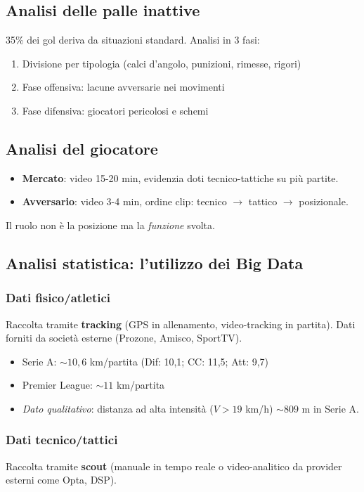 \documentclass[a4paper,11pt]{article}
\begin{document}
\subsection{Analisi delle palle inattive}
35\% dei gol deriva da situazioni standard. Analisi in 3 fasi:
\begin{enumerate}
    \item Divisione per tipologia (calci d'angolo, punizioni, rimesse, rigori)
    \item Fase offensiva: lacune avversarie nei movimenti
    \item Fase difensiva: giocatori pericolosi e schemi
\end{enumerate}

\subsection{Analisi del giocatore}
\begin{itemize}
    \item \textbf{Mercato}: video 15-20 min, evidenzia doti tecnico-tattiche su più partite.
    \item \textbf{Avversario}: video 3-4 min, ordine clip: tecnico $\to$ tattico $\to$ posizionale.
\end{itemize}
Il ruolo non è la posizione ma la \textit{funzione} svolta.

\subsection{Analisi statistica: l'utilizzo dei Big Data}
\subsubsection{Dati fisico/atletici}
Raccolta tramite \textbf{tracking} (GPS in allenamento, video-tracking in partita). Dati forniti da società esterne (Prozone, Amisco, SportTV).
\begin{itemize}
    \item Serie A: $\sim 10,6$ km/partita (Dif: 10,1; CC: 11,5; Att: 9,7)
    \item Premier League: $\sim 11$ km/partita
    \item \textit{Dato qualitativo}: distanza ad alta intensità ($V > 19$ km/h) $\sim 809$ m in Serie A.
\end{itemize}

\subsubsection{Dati tecnico/tattici}
Raccolta tramite \textbf{scout} (manuale in tempo reale o video-analitico da provider esterni come Opta, DSP).
\end{document}
